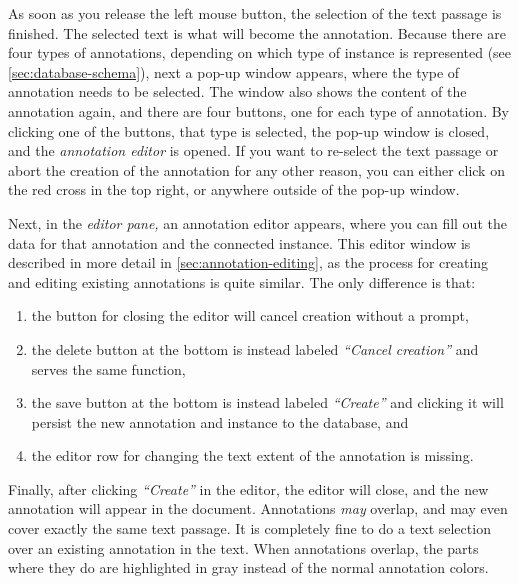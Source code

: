 As soon as you release the left mouse button, the selection of the text passage is finished.
The selected text is what will become the annotation.
Because there are four types of annotations, depending on which type of instance is represented (see \cref{sec:database-schema}), next a pop-up window appears, where the type of annotation needs to be selected.
The window also shows the content of the annotation again, and there are four buttons, one for each type of annotation.
By clicking one of the buttons, that type is selected, the pop-up window is closed, and the \emph{annotation editor} is opened.
If you want to re-select the text passage or abort the creation of the annotation for any other reason, you can either click on the red cross in the top right, or anywhere outside of the pop-up window.

Next, in the \emph{editor pane,} an annotation editor appears, where you can fill out the data for that annotation and the connected instance.
This editor window is described in more detail in \cref{sec:annotation-editing}, as the process for creating and editing existing annotations is quite similar.
The only difference is that:

\begin{enumerate}
  \item the button for closing the editor will cancel creation without a prompt,
  \item the delete button at the bottom is instead labeled \emph{\enquote{Cancel creation}} and serves the same function,
  \item the save button at the bottom is instead labeled \emph{\enquote{Create}} and clicking it will persist the new annotation and instance to the database, and
  \item the editor row for changing the text extent of the annotation is missing.
\end{enumerate}

Finally, after clicking \emph{\enquote{Create}} in the editor, the editor will close, and the new annotation will appear in the document.
Annotations \emph{may} overlap, and may even cover exactly the same text passage.
It is completely fine to do a text selection over an existing annotation in the text.
When annotations overlap, the parts where they do are highlighted in gray instead of the normal annotation colors.

